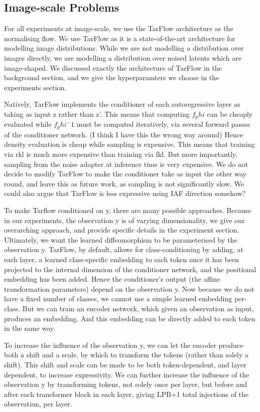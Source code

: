 \documentclass[12pt,a4paper]{report}
\begin{document}
\subsection{Image-scale Problems}
For all experiments at image-scale, we use the TarFlow architecture as the normalising flow. 
We use TarFlow as it is a state-of-the-art architecture for modelling image distributions.  
While we are not modelling a distribution over images directly, we are modelling a distribution over noised latents which are image-shaped. 
We discussed exactly the architecture of TarFlow in the background section, and we give the hyperparamters we choose in the experiments section. 

Natively, TarFlow implements the conditioner of each autoregressive layer as taking as input z rather than z'. 
This means that computing $f_phi$ can be cheaply evaluated while $f_phi^-1$ must be computed iteratively, via several forward passes of the conditioner network. (I think I have this the wrong way around)
Hence density evaluation is cheap while sampling is expensive. 
This means that training via rkl is much more expensive than training via fkl. 
But more importantly, sampling from the noise adapter at inference time is very expensive. 
We do not decide to modify TarFlow to make the conditioner take as input the other way round, and leave this as future work, as sampling is not significantly slow. 
We could also argue that TarFlow is less expressive using IAF direction somehow?

To make Tarflow conditioned on y, there are many possible approaches. 
Because in our experiments, the observation y is of varying dimensionality, we give our overarching approach, and provide specific details in the experiment section. 
Ultimately, we want the learned diffeomorphism to be parameterised by the observation y. 
TarFlow, by default, allows for class-conditioning by adding, at each layer, a learned class-specific embedding to each token once it has been projected to the internal dimension of the conditioner network, and the positional embedding has been added. 
Hence the conditioner's output (the affine transformation parameters) depend on the observation y. 
Now because we do not have a fixed number of classes, we cannot use a simple learned embedding per-class. 
But we can train an encoder network, which given an observation as input, produces an embedding. 
And this embedding can be directly added to each token in the same way. 

To increase the influence of the observation y, we can let the encoder produce both a shift and a scale, by which to transform the tokens (rather than solely a shift). This shift and scale can be made to be both token-dependent, and layer dependent, to increase expressivity. 
We can further increase the influence of the observation y by transforming tokens, not solely once per layer, but before and after each transformer block in each layer, giving LPB+1 total injections of the observation, per layer. 
\end{document}
